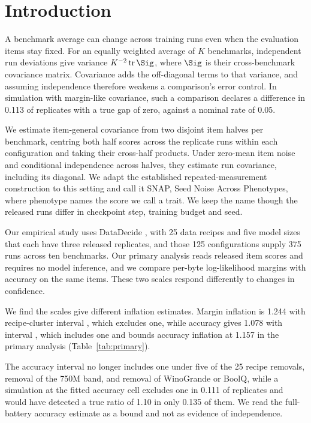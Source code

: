\section{Introduction}
A benchmark average can change across training runs even when the evaluation items stay fixed. For an equally weighted average of $K$ benchmarks, independent run deviations give variance $K^{-2}\operatorname{tr}\Sig$, where $\Sig$ is their cross-benchmark covariance matrix. Covariance adds the off-diagonal terms to that variance, and assuming independence therefore weakens a comparison's error control. In simulation with margin-like covariance, such a comparison declares a difference in 0.113 of replicates with a true gap of zero, against a nominal rate of 0.05.

We estimate item-general covariance from two disjoint item halves per benchmark, centring both half scores across the replicate runs within each configuration and taking their cross-half products. Under zero-mean item noise and conditional independence across halves, they estimate run covariance, including its diagonal. We adapt the established repeated-measurement construction to this setting and call it SNAP, Seed Noise Across Phenotypes, where phenotype names the score we call a trait. We keep the name though the released runs differ in checkpoint step, training budget and seed.

Our empirical study uses DataDecide \citep{magnusson2025}, with 25 data recipes and five model sizes that each have three released replicates, and those 125 configurations supply 375 runs across ten benchmarks. Our primary analysis reads released item scores and requires no model inference, and we compare per-byte log-likelihood margins with accuracy on the same items. These two scales respond differently to changes in confidence.

We find the scales give different inflation estimates. Margin inflation is 1.244 with recipe-cluster interval , which excludes one, while accuracy gives 1.078 with interval , which includes one and bounds accuracy inflation at 1.157 in the primary analysis (Table~\ref{tab:primary}).

The accuracy interval no longer includes one under five of the 25 recipe removals, removal of the 750M band, and removal of WinoGrande or BoolQ, while a simulation at the fitted accuracy cell excludes one in 0.111 of replicates and would have detected a true ratio of 1.10 in only 0.135 of them. We read the full-battery accuracy estimate as a bound and not as evidence of independence.


